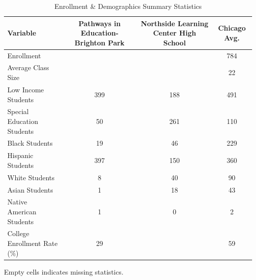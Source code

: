\begin{table}[H]
\renewcommand{\arraystretch}{1.5}
\caption*{
{\large Enrollment \& Demographics Summary Statistics}
} 

\fontsize{10pt}{11pt}\selectfont

\begin{tabular*}{\linewidth}{@{\extracolsep{\fill}}lccc}
\toprule
Variable & Pathways in Education- Brighton Park & Northside Learning Center High School & Chicago Avg. \\ 
\midrule\addlinespace[2.5pt]
Enrollment &  &  & 784 \\
Average Class Size &  &  & 22 \\
Low Income Students & 399 & 188 & 491 \\
Special Education Students & 50 & 261 & 110 \\
Black Students & 19 & 46 & 229 \\
Hispanic Students & 397 & 150 & 360 \\
White Students & 8 & 40 & 90 \\
Asian Students & 1 & 18 & 43 \\
Native American Students & 1 & 0 & 2 \\
College Enrollment Rate (\%) & 29 &  & 59 \\
\bottomrule
\end{tabular*}
\begin{minipage}{\linewidth}
Empty cells indicates missing statistics.\\
\end{minipage}
\end{table}
